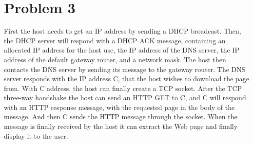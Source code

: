 \documentclass[paper=a4, fontsize=11pt]{scrartcl}
\numberwithin{equation}{section}		%
\numberwithin{figure}{section}			%
\numberwithin{table}{section}				%
\begin{document}
\section*{Problem 3}
First the host needs to get an IP address by sending a DHCP broadcast. Then, the DHCP server will respond with a DHCP ACK message, containing an allocated IP address for the host use, the IP address of the DNS server, the IP address of the default gateway router, and a network mask. The host then contacts the DNS server by sending its message to the gateway router. The DNS server responds with the IP address C, that the host wishes to download the page from. With C address, the host can finally create a TCP socket. After the TCP three-way handshake the host can send an HTTP GET to C, and C will respond with an HTTP response message, with the requested page in the body of the message. And then C sends the HTTP message through the socket. When the message is finally received by the host it can extract the Web page and finally display it to the user.


\end{document}
